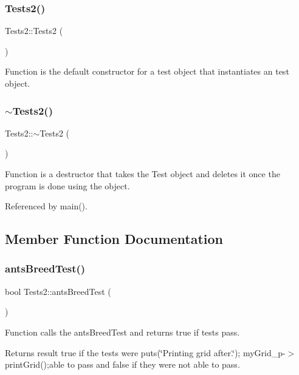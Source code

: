 \subsubsection{Tests2()}
{\footnotesize\ttfamily Tests2\+::\+Tests2 (\begin{DoxyParamCaption}{ }\end{DoxyParamCaption})}

Function is the default constructor for a test object that instantiates an test object. \mbox{\label{classTests2_abed1a850ef511b7c06ae418cb3bbd5d9}} 
\subsubsection{$\sim$\+Tests2()}
{\footnotesize\ttfamily Tests2\+::$\sim$\+Tests2 (\begin{DoxyParamCaption}{ }\end{DoxyParamCaption})\hspace{0.3cm}{\ttfamily [virtual]}}

Function is a destructor that takes the Test object and deletes it once the program is done using the object. 

Referenced by main().



\subsection{Member Function Documentation}
\mbox{\label{classTests2_a21e7692afbdfb694caf370670cbeb7d4}} 
\subsubsection{ants\+Breed\+Test()}
{\footnotesize\ttfamily bool Tests2\+::ants\+Breed\+Test (\begin{DoxyParamCaption}{ }\end{DoxyParamCaption})}

Function calls the ants\+Breed\+Test and returns true if tests pass.

\begin{DoxyReturn}{Returns}
result true if the tests were puts(\char`\"{}\+Printing grid after.\char`\"{}); my\+Grid\+\_\+p-\/$>$print\+Grid();able to pass and false if they were not able to pass. 
\end{DoxyReturn}


